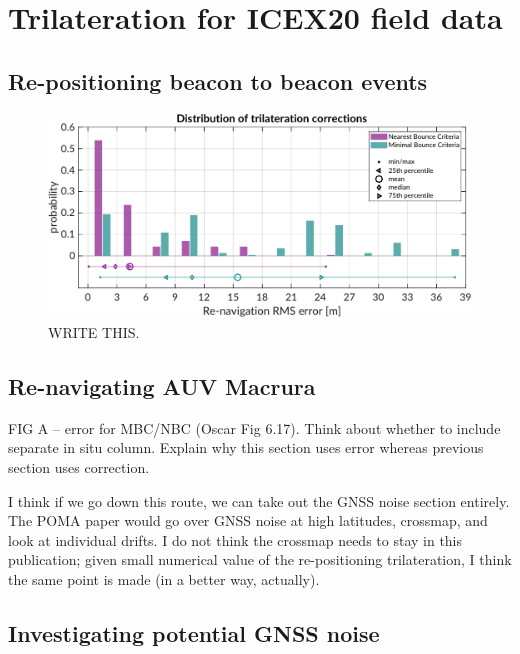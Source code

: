 \clearpage
\section{Trilateration for ICEX20 field data}\label{sec:trilat}

\subsection{Re-positioning beacon to beacon events}

\begin{figure}[!ht]
\includegraphics[width=\textwidth]{figs/trilat-stat.pdf}
\caption{WRITE THIS.}
\label{fig:trilat}
\end{figure}

\subsection{Re-navigating AUV Macrura}

FIG A -- error for MBC/NBC (Oscar Fig 6.17). Think about whether to include separate in situ column. Explain why this section uses error whereas previous section uses correction.

I think if we go down this route, we can take out the GNSS noise section entirely. The POMA paper would go over GNSS noise at high latitudes, crossmap, and look at individual drifts. I do not think the crossmap needs to stay in this publication; given small numerical value of the re-positioning trilateration, I think the same point is made (in a better way, actually).

\subsection{Investigating potential GNSS noise}

